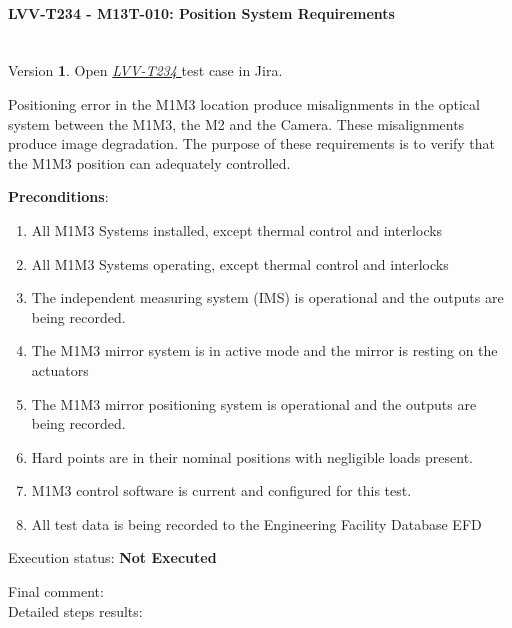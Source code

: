 \documentclass[SE,lsstdraft,STR,toc]{lsstdoc}
\providecommand{\tightlist}{
  \setlength{\itemsep}{0pt}\setlength{\parskip}{0pt}}
\begin{document}
\paragraph{ LVV-T234 - M13T-010: Position System Requirements }\mbox{}\\

Version \textbf{1}.
Open  \href{https://jira.lsstcorp.org/secure/Tests.jspa#/testCase/LVV-T234}{\textit{ LVV-T234 } }
test case in Jira.

Positioning error in the M1M3 location produce misalignments in the
optical system between the M1M3, the M2 and the Camera. These
misalignments produce image degradation. The purpose of these
requirements is to verify that the M1M3 position can adequately
controlled.

\textbf{ Preconditions}:\\
\begin{enumerate}
\tightlist
\item
  All M1M3 Systems installed, except thermal control and interlocks
\item
  All M1M3 Systems operating, except thermal control and interlocks
\item
  The independent measuring system (IMS) is operational and the outputs
  are being recorded.
\item
  The M1M3 mirror system is in active mode and the mirror is resting on
  the actuators
\item
  The M1M3 mirror positioning system is operational and the outputs are
  being recorded.
\item
  Hard points are in their nominal positions with negligible loads
  present.
\item
  M1M3 control software is current and configured for this test.
\item
  All test data is being recorded to the Engineering Facility Database
  EFD
\end{enumerate}

Execution status: {\bf Not Executed }

Final comment:\\


Detailed steps results:
\end{document}
